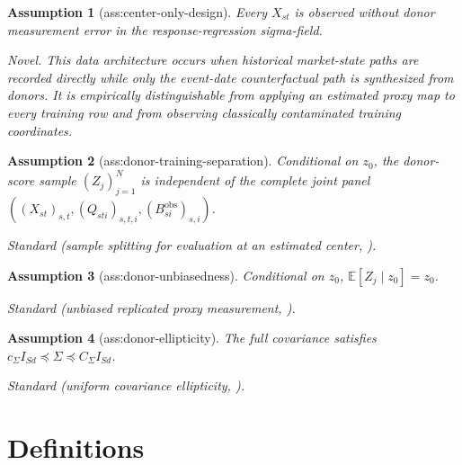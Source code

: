 \documentclass{article}
\newtheorem{assumption}{Assumption}
\begin{document}
\begin{assumption}[ass:center-only-design]\label{ass:center-only-design}
Every \(X_{st}\) is observed without donor measurement error in the response-regression sigma-field.
\par\smallskip\noindent\emph{Novel.} This data architecture occurs when historical market-state paths are recorded directly while only the event-date counterfactual path is synthesized from donors. It is empirically distinguishable from applying an estimated proxy map to every training row and from observing classically contaminated training coordinates.
\end{assumption}

\begin{assumption}[ass:donor-training-separation]\label{ass:donor-training-separation}
Conditional on \(z_0\), the donor-score sample \((Z_j)_{j=1}^{N}\) is independent of the complete joint panel \(((X_{st})_{s,t},(Q_{sti})_{s,t,i},(B_{si}^{\mathrm{obs}})_{s,i})\).
\par\smallskip\noindent\emph{Standard} (sample splitting for evaluation at an estimated center, \cite{AkhavanGogolashviliTsybakov2024}).
\end{assumption}

\begin{assumption}[ass:donor-unbiasedness]\label{ass:donor-unbiasedness}
Conditional on \(z_0\), \(\mathbb E[Z_j\mid z_0]=z_0\).
\par\smallskip\noindent\emph{Standard} (unbiased replicated proxy measurement, \cite{DelaigleHallMeister2008}).
\end{assumption}

\begin{assumption}[ass:donor-ellipticity]\label{ass:donor-ellipticity}
The full covariance satisfies \(c_\Sigma I_{Sd}\preceq\Sigma\preceq C_\Sigma I_{Sd}\).
\par\smallskip\noindent\emph{Standard} (uniform covariance ellipticity, \cite{CattaneoFengTitiunik2021}).
\end{assumption}

\section{Definitions}
\end{document}
